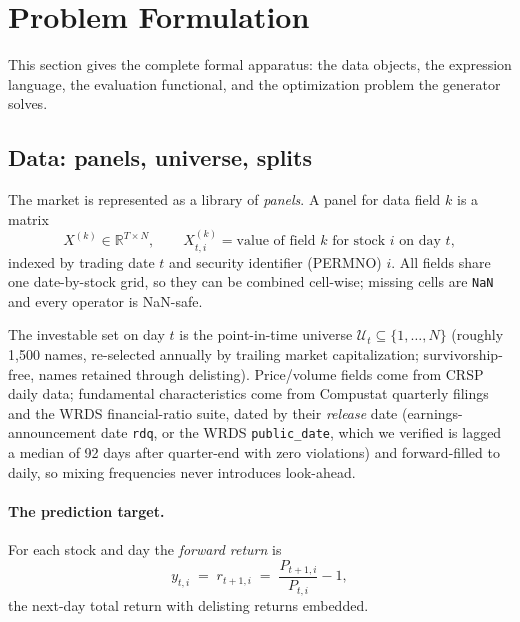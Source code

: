 \documentclass{article}
\theoremstyle{definition}
\theoremstyle{plain}
\theoremstyle{remark}
\newcommand{\R}{\mathbb{R}}
\newcommand{\Uni}{\mathcal{U}}
\begin{document}
\section{Problem Formulation}
\label{sec:formulation}

This section gives the complete formal apparatus: the data objects, the expression
language, the evaluation functional, and the optimization problem the generator solves.

\subsection{Data: panels, universe, splits}
\label{sec:data}

The market is represented as a library of \emph{panels}. A panel for data field $k$ is
a matrix
\[
X^{(k)} \in \R^{T \times N}, \qquad X^{(k)}_{t,i} = \text{value of field } k \text{ for stock } i \text{ on day } t,
\]
indexed by trading date $t$ and security identifier (PERMNO) $i$. All fields share one
date-by-stock grid, so they can be combined cell-wise; missing cells are \texttt{NaN}
and every operator is NaN-safe.

The investable set on day $t$ is the point-in-time universe
$\Uni_t \subseteq \{1,\dots,N\}$ (roughly 1{,}500 names, re-selected annually by
trailing market capitalization; survivorship-free, names retained through delisting).
Price/volume fields come from CRSP daily data; fundamental characteristics come from
Compustat quarterly filings and the WRDS financial-ratio suite, dated by their
\emph{release} date (earnings-announcement date \texttt{rdq}, or the WRDS
\texttt{public\_date}, which we verified is lagged a median of 92 days after
quarter-end with zero violations) and forward-filled to daily, so mixing frequencies
never introduces look-ahead.

\paragraph{The prediction target.} For each stock and day the \emph{forward return} is
\[
y_{t,i} \;=\; r_{t+1,i} \;=\; \frac{P_{t+1,i}}{P_{t,i}} - 1,
\]
the next-day total return with delisting returns embedded.
\end{document}
